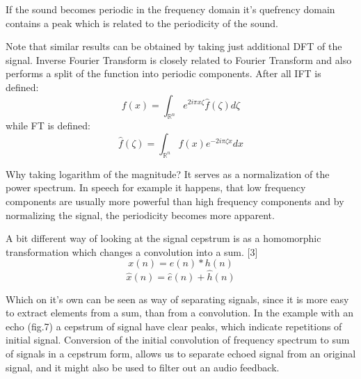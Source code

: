 \documentclass[12pt,a4paper,english]{article}
\begin{document}
\begin{minipage}[5cm,0]{11cm}

If the sound becomes periodic in the frequency domain it's quefrency domain contains a peak which is related to the periodicity of the sound. \newline

Note that similar results can be obtained by taking just additional DFT of the signal. Inverse Fourier Transform is closely related to Fourier Transform and also performs a split of the function into periodic components. \newline
\newline
After all IFT is defined:
\begin{equation}
     f(x) = \int_{\mathbb{R} ^ n} e^{2 i \pi x \zeta} \hat{f}(\zeta) d\zeta
\end{equation}
while FT is defined: 
\begin{equation}
    \hat{f}(\zeta) = \int_{\mathbb{R} ^ n} f(x) e^{-2 i \pi \zeta x} dx
\end{equation}

Why taking logarithm of the magnitude? It serves as a normalization of the power spectrum. In speech for example it happens, that low frequency components are usually more powerful than high frequency components and by normalizing the signal, the periodicity becomes more apparent. \newline


A bit different way of looking at the signal cepstrum is as a homomorphic transformation which changes a convolution into a sum. [3]
\begin{equation}
x(n) = e(n) * h(n)
\end{equation}
\begin{equation}
\hat x(n) = \hat e(n) + \hat h(n)
\end{equation}


Which on it's own can be seen as way of separating signals, since it is more easy to extract elements from a sum, than from a convolution.
\newline
\newline
In the example with an echo (fig.7) a cepstrum of signal have clear peaks, which indicate repetitions of initial signal. Conversion of the initial convolution of frequency spectrum to sum of signals in a cepstrum form, allows us to separate echoed signal from an original signal, and it might also be used to filter out an audio feedback.

\end{minipage}
\newline
\newline
{}
\label{fig:fig1}
\end{document}
